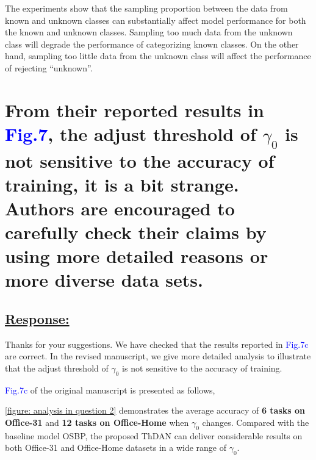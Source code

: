 The experiments show that the sampling proportion between the data from known and unknown classes can substantially affect model performance for both the known and unknown classes.
Sampling too much data from the unknown class will degrade the performance of categorizing known classes.
On the other hand, sampling too little data from the unknown class will affect the performance of rejecting ``unknown''.

\section{From their reported results in \textcolor{blue}{Fig.7}, the adjust threshold of $\gamma_0$ is not sensitive to the accuracy of training, it is a bit strange.
Authors are encouraged to carefully check their claims by using more detailed reasons or more diverse data sets. }
\label{Question: threshold}
\subsection*{\underline{\textbf{Response:}}}

Thanks for your suggestions.
We have checked that the results reported in \textcolor{blue}{Fig.7c} are correct.
In the revised manuscript, we give more detailed analysis to illustrate that the adjust threshold of $\gamma_0$ is not sensitive to the accuracy of training.

\textcolor{blue}{Fig.7c} of the original manuscript is presented as follows,

\newline
\figurename{\ref{figure: analysis in question 2}} demonstrates the average accuracy of \textbf{6 tasks on Office-31} and \textbf{12 tasks on Office-Home} when $\gamma_0$ changes.
Compared with the baseline model OSBP, the proposed ThDAN can deliver considerable results on both Office-31 and Office-Home datasets in a wide range of $\gamma_0$.

